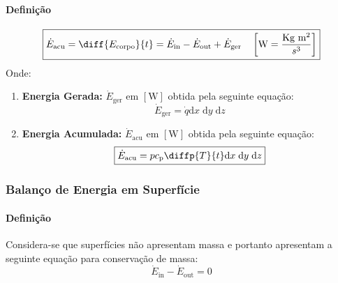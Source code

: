 \documentclass{article}
\begin{document}
            \paragraph{Definição}
                \begin{equation}
                    \boxed{
                        \dot{E}_{\text{acu}} = 
                        \diff{E_{\text{corpo}}}{t} = 
                        \dot{E}_{\text{in}} - 
                        \dot{E}_{\text{out}} + 
                        \dot{E}_{\text{ger}}
                        \quad
                        \left[
                            \text{W} = \frac{\text{Kg m\textsuperscript{2}}}{s\textsuperscript{3}}
                        \right]
                    }
                \end{equation}
            Onde:
                \begin{enumerate}[noitemsep]
                    \item \textbf{Energia Gerada:} $\dot{E}_{\text{ger}}$ em $[\text{W}]$ obtida pela seguinte equação:
                        \begin{equation}
                            \boxed{
                                \dot{E}_{\text{ger}} = \dot{q} \text{d}x\; \text{d}y\; \text{d}z
                            }
                        \end{equation}

                    \item \textbf{Energia Acumulada:} $\dot{E}_{\text{acu}}$ em $[\text{W}]$ obtida pela seguinte equação:
                        \begin{equation}
                            \boxed{
                                \dot{E}_{\text{acu}} = p c_{\text{p}} \diffp{T}{t} \text{d}x\; \text{d}y\; \text{d}z
                            }
                        \end{equation}
                \end{enumerate}

        \subsubsection{Balanço de Energia em Superfície}
            \paragraph{Definição}Considera-se que superfícies não apresentam massa e portanto apresentam a seguinte equação para conservação de massa:
                \begin{equation}
                    \boxed{
                        \dot{E}_{\text{in}} - \dot{E}_{\text{out}} = 0
                    }
                \end{equation}
\end{document}
